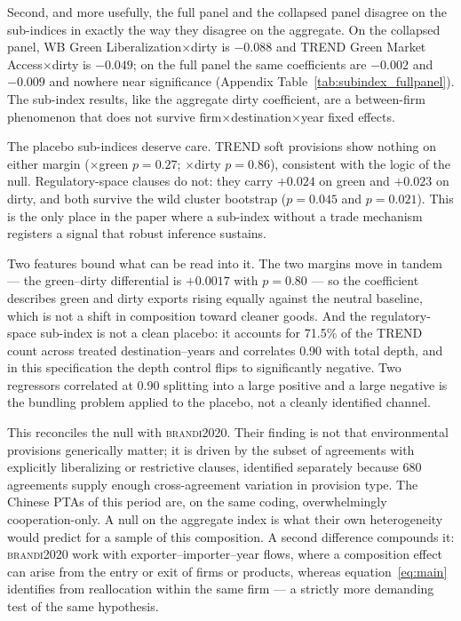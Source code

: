 \documentclass[11pt]{article}
\newcommand{\citet}[1]{\textsc{#1}}
\begin{document}
Second, and more usefully, the full panel and the collapsed panel disagree on the sub-indices in
exactly the way they disagree on the aggregate. On the collapsed panel, WB Green
Liberalization$\times$dirty is $-0.088$ and TREND Green Market Access$\times$dirty is $-0.049$; on
the full panel the same coefficients are $-0.002$ and $-0.009$ and nowhere near significance
(Appendix Table~\ref{tab:subindex_fullpanel}). The sub-index results, like the aggregate dirty
coefficient, are a between-firm phenomenon that does not survive firm$\times$destination$\times$year
fixed effects.

The placebo sub-indices deserve care. TREND soft provisions show nothing on either margin
($\times$green $p = 0.27$; $\times$dirty $p = 0.86$), consistent with the logic of the null.
Regulatory-space clauses do not: they carry $+0.024$ on green and $+0.023$ on dirty, and both
survive the wild cluster bootstrap ($p = 0.045$ and $p = 0.021$). This is the only place in the
paper where a sub-index without a trade mechanism registers a signal that robust inference sustains.

Two features bound what can be read into it. The two margins move in tandem --- the green--dirty
differential is $+0.0017$ with $p = 0.80$ --- so the coefficient describes green and dirty exports
rising equally against the neutral baseline, which is not a shift in composition toward cleaner
goods. And the regulatory-space sub-index is not a clean placebo: it accounts for 71.5\% of the
TREND count across treated destination--years and correlates 0.90 with total depth, and in this
specification the depth control flips to significantly negative. Two regressors correlated at 0.90
splitting into a large positive and a large negative is the bundling problem applied to the
placebo, not a cleanly identified channel.



This reconciles the null with \citet{brandi2020}. Their finding is not that environmental provisions
generically matter; it is driven by the subset of agreements with explicitly liberalizing or
restrictive clauses, identified separately because 680 agreements supply enough cross-agreement
variation in provision type. The Chinese PTAs of this period are, on the same coding, overwhelmingly
cooperation-only. A null on the aggregate index is what their own heterogeneity would predict for a
sample of this composition. A second difference compounds it: \citet{brandi2020} work with
exporter--importer--year flows, where a composition effect can arise from the entry or exit of firms
or products, whereas equation~\eqref{eq:main} identifies from reallocation within the same firm ---
a strictly more demanding test of the same hypothesis.
\end{document}

